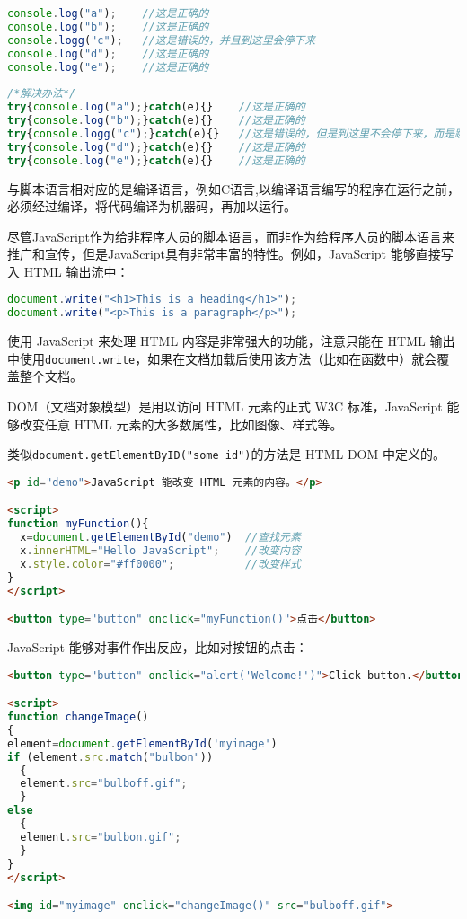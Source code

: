 \begin{lstlisting}[language=JavaScript]
console.log("a");    //这是正确的
console.log("b");    //这是正确的
console.logg("c");   //这是错误的，并且到这里会停下来
console.log("d");    //这是正确的
console.log("e");    //这是正确的
 
/*解决办法*/
try{console.log("a");}catch(e){}    //这是正确的
try{console.log("b");}catch(e){}    //这是正确的
try{console.logg("c");}catch(e){}   //这是错误的，但是到这里不会停下来，而是跳过
try{console.log("d");}catch(e){}    //这是正确的
try{console.log("e");}catch(e){}    //这是正确的
\end{lstlisting}

与脚本语言相对应的是编译语言，例如C语言,以编译语言编写的程序在运行之前，必须经过编译，将代码编译为机器码，再加以运行。





尽管JavaScript作为给非程序人员的脚本语言，而非作为给程序人员的脚本语言来推广和宣传，但是JavaScript具有非常丰富的特性。例如，JavaScript 能够直接写入 HTML 输出流中：

\begin{lstlisting}[language=JavaScript]
document.write("<h1>This is a heading</h1>");
document.write("<p>This is a paragraph</p>");
\end{lstlisting}

使用 JavaScript 来处理 HTML 内容是非常强大的功能，注意只能在 HTML 输出中使用\texttt{document.write}，如果在文档加载后使用该方法（比如在函数中）就会覆盖整个文档。

DOM（文档对象模型）是用以访问 HTML 元素的正式 W3C 标准，JavaScript 能够改变任意 HTML 元素的大多数属性，比如图像、样式等。

类似\texttt{document.getElementByID("some id")}的方法是 HTML DOM 中定义的。

\begin{lstlisting}[language=HTML]
<p id="demo">JavaScript 能改变 HTML 元素的内容。</p>

<script>
function myFunction(){
  x=document.getElementById("demo")  //查找元素
  x.innerHTML="Hello JavaScript";    //改变内容
  x.style.color="#ff0000";           //改变样式
}
</script>

<button type="button" onclick="myFunction()">点击</button>
\end{lstlisting}



JavaScript 能够对事件作出反应，比如对按钮的点击：
\begin{lstlisting}[language=HTML]
<button type="button" onclick="alert('Welcome!')">Click button.</button>

<script>
function changeImage()
{
element=document.getElementById('myimage')
if (element.src.match("bulbon"))
  {
  element.src="bulboff.gif";
  }
else
  {
  element.src="bulbon.gif";
  }
}
</script>

<img id="myimage" onclick="changeImage()" src="bulboff.gif">
\end{lstlisting}

